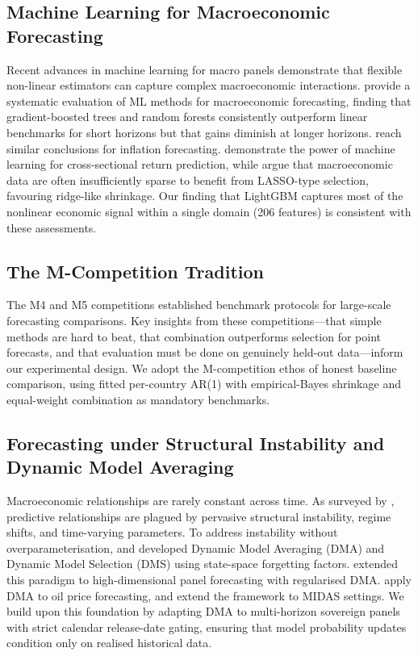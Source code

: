 \documentclass[11pt,a4paper]{article}
\begin{document}
\subsection{Machine Learning for Macroeconomic Forecasting}

Recent advances in machine learning for macro panels demonstrate that flexible non-linear estimators can capture complex macroeconomic interactions. \citet{goulletcoulombe2022} provide a systematic evaluation of ML methods for macroeconomic forecasting, finding that gradient-boosted trees and random forests consistently outperform linear benchmarks for short horizons but that gains diminish at longer horizons. \citet{medeiros2021} reach similar conclusions for inflation forecasting. \citet{gu2020} demonstrate the power of machine learning for cross-sectional return prediction, while \citet{giannone2021} argue that macroeconomic data are often insufficiently sparse to benefit from LASSO-type selection, favouring ridge-like shrinkage. Our finding that LightGBM captures most of the nonlinear economic signal within a single domain (206 features) is consistent with these assessments.

\subsection{The M-Competition Tradition}

The M4 \citep{makridakis2018} and M5 \citep{makridakis2022} competitions established benchmark protocols for large-scale forecasting comparisons. Key insights from these competitions---that simple methods are hard to beat, that combination outperforms selection for point forecasts, and that evaluation must be done on genuinely held-out data---inform our experimental design. We adopt the M-competition ethos of honest baseline comparison, using fitted per-country AR(1) with empirical-Bayes shrinkage and equal-weight combination as mandatory benchmarks.

\subsection{Forecasting under Structural Instability and Dynamic Model Averaging}

Macroeconomic relationships are rarely constant across time. As surveyed by \citet{rossi2013}, predictive relationships are plagued by pervasive structural instability, regime shifts, and time-varying parameters. To address instability without overparameterisation, \citet{raftery2010} and \citet{koop2011, koop2012} developed Dynamic Model Averaging (DMA) and Dynamic Model Selection (DMS) using state-space forgetting factors. \citet{korobilis2020} extended this paradigm to high-dimensional panel forecasting with regularised DMA. \citet{aastveit2014} apply DMA to oil price forecasting, and \citet{aastveit2019} extend the framework to MIDAS settings. We build upon this foundation by adapting DMA to multi-horizon sovereign panels with strict calendar release-date gating, ensuring that model probability updates condition only on realised historical data.
\end{document}
